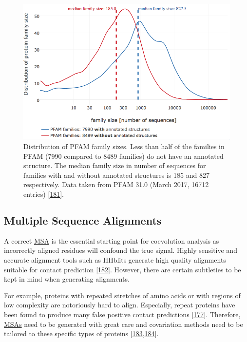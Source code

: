 \documentclass[11pt,a4paper,twoside]{book}
\theoremstyle{definition}
\theoremstyle{definition}
\theoremstyle{remark}
\begin{document}
\begin{figure}

{\centering \includegraphics[width=0.9\linewidth]{img/pfam_pdb_notitle} 

}

\caption{Distribution of PFAM family sizes. Less than half of
the families in PFAM (7990 compared to 8489 families) do not have an
annotated structure. The median family size in number of sequences for
families with and without annotated structures is 185 and 827
respectively. Data taken from PFAM 31.0 (March 2017, 16712 entries)
{[}\protect\hyperlink{ref-Finn2016}{181}{]}.}\label{fig:pfam}
\end{figure}

\subsection{Multiple Sequence
Alignments}\label{multiple-sequence-alignments}

A correct \protect\hyperlink{abbrev}{MSA} is the essential starting
point for coevolution analysis as incorrectly aligned residues will
confound the true signal. Highly sensitive and accurate alignment tools
such as HHblits generate high quality alignments suitable for contact
prediction {[}\protect\hyperlink{ref-Remmert2012}{182}{]}. However,
there are certain subtleties to be kept in mind when generating
alignments.

For example, proteins with repeated stretches of amino acids or with
regions of low complexity are notoriously hard to align. Especially,
repeat proteins have been found to produce many false positive contact
predictions {[}\protect\hyperlink{ref-Anishchenko2017}{177}{]}.
Therefore, \protect\hyperlink{abbrev}{MSAs} need to be generated with
great care and covariation methods need to be tailored to these specific
types of proteins
{[}\protect\hyperlink{ref-Espada2014}{183},\protect\hyperlink{ref-Toth-Petroczy2016}{184}{]}.
\end{document}
